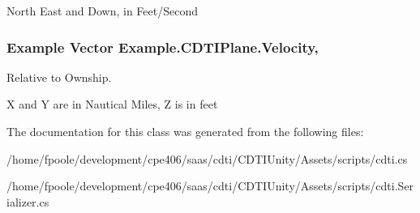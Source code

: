 North East and Down, in Feet/\+Second

\hypertarget{class_example_1_1_c_d_t_i_plane_ac20719084518e459b372465f3d862772}{}
\subsubsection[{Velocity}]{\setlength{\rightskip}{0pt plus 5cm}Example {\bf Vector} Example.\+C\+D\+T\+I\+Plane.\+Velocity\hspace{0.3cm}{\ttfamily [get]}, {\ttfamily [set]}}\label{class_example_1_1_c_d_t_i_plane_ac20719084518e459b372465f3d862772}




Relative to Ownship.

X and Y are in Nautical Miles, Z is in feet

The documentation for this class was generated from the following files\+:\begin{DoxyCompactItemize}
\item 
/home/fpoole/development/cpe406/saas/cdti/\+C\+D\+T\+I\+Unity/\+Assets/scripts/cdti.\+cs\item 
/home/fpoole/development/cpe406/saas/cdti/\+C\+D\+T\+I\+Unity/\+Assets/scripts/cdti.\+Serializer.\+cs\end{DoxyCompactItemize}

